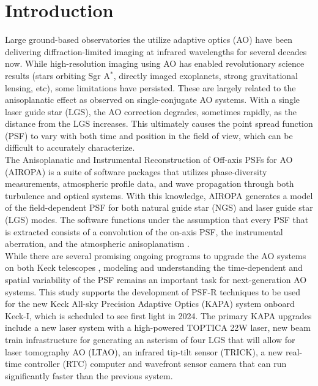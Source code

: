 \documentclass[]{spie}  %
\begin{document}
\section{Introduction} \label{sec:intro}
Large ground-based observatories the utilize adaptive optics (AO) have been delivering diffraction-limited imaging at infrared wavelengths for several decades now. While high-resolution imaging using AO has enabled revolutionary science results (stars orbiting Sgr A$^*$, directly imaged exoplanets, strong gravitational lensing, etc), some limitations have persisted. These are largely related to the anisoplanatic effect as observed on single-conjugate AO systems. With a single laser guide star (LGS), the AO correction degrades, sometimes rapidly, as the distance from the LGS increases. This ultimately causes the point spread function (PSF) to vary with both time and position in the field of view, which can be difficult to accurately characterize.\\
\indent The Anisoplanatic and Instrumental Reconstruction of Off-axis PSFs for AO (AIROPA) is a suite of software packages that utilizes phase-diversity measurements, atmospheric profile data, and wave propagation through both turbulence and optical systems. With this knowledge, AIROPA generates a model of the field-dependent PSF for both natural guide star (NGS) and laser guide star (LGS) modes. The software functions under the assumption that every PSF that is extracted consists of a convolution of the on-axis PSF, the instrumental aberration, and the atmospheric anisoplanatism \cite{do:2018a}.\\
\indent While there are several promising ongoing programs to upgrade the AO systems on both Keck telescopes \cite{wizinowich:2020a, bond:2020a}, modeling and understanding the time-dependent and spatial variability of the PSF remains an important task for next-generation AO systems. This study supports the development of PSF-R techniques to be used for the new Keck All-sky Precision Adaptive Optics (KAPA) system onboard Keck-I, which is scheduled to see first light in 2024. The primary KAPA upgrades include a new laser system with a high-powered TOPTICA 22W laser, new beam train infrastructure for generating an asterism of four LGS that will allow for laser tomography AO (LTAO), an infrared tip-tilt sensor (TRICK), a new real-time controller (RTC) computer and wavefront sensor camera that can run significantly faster than the previous system.\\
\end{document}
